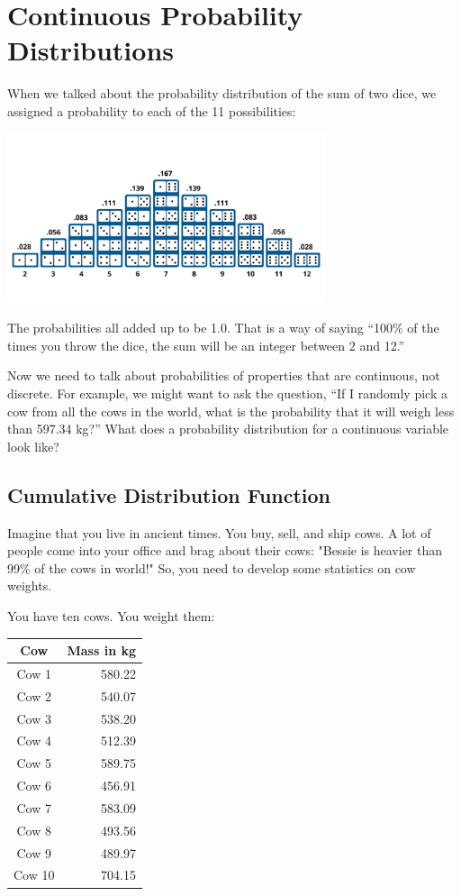 \chapter{Continuous Probability Distributions}

When we talked about the probability distribution of the sum of two dice,  we assigned a probability to each of the 11 possibilities:

\includegraphics[width=0.7\textwidth]{dice_histogram.png}

The probabilities all added up to be 1.0.  That is a way of saying ``100\% of the times you throw the dice,  the sum will be an integer between 2 and 12.''

Now we need to talk about probabilities of properties that are continuous,  not discrete. For example, we might want to ask the question, ``If I randomly pick a cow from all the cows in the 
world, what is the probability that it will weigh less than 597.34 kg?''  What does a probability distribution for a continuous variable look like?

\section{Cumulative Distribution Function}

Imagine that you live in ancient times.  You buy, sell, and ship cows. A lot of people come into your office and brag about their cows: "Bessie is heavier than 99\% of the cows in 
world!"  So, you need to develop some statistics on cow weights.

You have ten cows. You weight them:

\begin{tabular}{c|r}
Cow & Mass in kg \\
\hline
Cow 1 & 580.22 \\
Cow 2 & 540.07 \\
Cow 3 & 538.20 \\
Cow 4 & 512.39 \\
Cow 5 & 589.75 \\
Cow 6 & 456.91 \\
Cow 7 & 583.09 \\
Cow 8 & 493.56 \\
Cow 9 & 489.97 \\
Cow 10 & 704.15 \\
\end{tabular}

